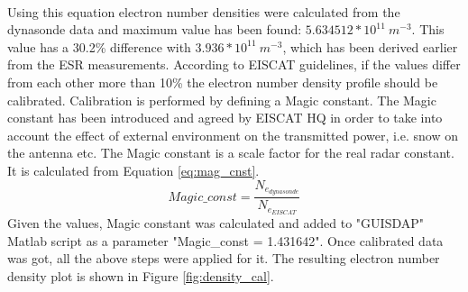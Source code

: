 \documentclass{article}
\begin{document}
\\
Using this equation electron number densities were calculated from the dynasonde data and maximum value has been found: $5.634512*10^{11}\:m^{-3}$. This value has a 30.2\% difference with $3.936*10^{11}\:m^{-3}$, which has been derived earlier from the ESR measurements. According to EISCAT guidelines, if the values differ from each other more than 10\% the electron number density profile should be calibrated. Calibration is performed by defining a Magic constant. The Magic constant has been introduced and agreed by EISCAT HQ in order to take into account the effect of external environment on the transmitted power, i.e. snow on the antenna etc. The Magic constant is a scale factor for the real radar constant. \cite{Barabash:2011esr} It is calculated from Equation \ref{eq:mag_cnst}.
\begin{equation}
\label{eq:mag_cnst}
Magic\_const=\frac{N_{e_{dynasonde}}}{N_{e_{EISCAT}}}
\end{equation}
Given the values, Magic constant was calculated and added to "GUISDAP" Matlab script as a parameter "Magic\_const = 1.431642". Once calibrated data was got, all the above steps were applied for it. The resulting electron number density plot is shown in Figure \ref{fig:density_cal}.
\end{document}

